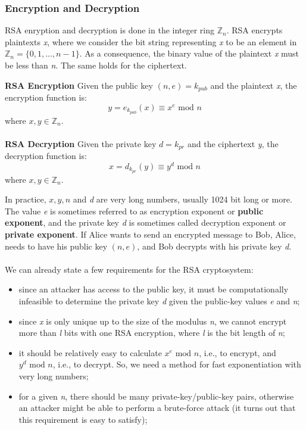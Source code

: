 \documentclass[11pt, a4paper]{article}
\newcommand{\mymod}{
    \text{ mod }
}
\begin{document}
\subsubsection{Encryption and Decryption}
RSA enryption and decryption is done in the integer ring $\mathbb{Z}_n$. RSA encrypts plaintexts \textit{x}, where we consider the bit string representing \textit{x} to be an element in $\mathbb{Z}_n=\{0,1,...,n-1\}$. As a consequence, the binary value of the plaintext \textit{x} must be less than \textit{n}. The same holds for the ciphertext.
\begin{framed}
    \hfill\break\textbf{RSA Encryption} Given the public key $(n,e)=k_{pub}$ and the plaintext \textit{x}, the encryption function \nolinebreak is:
    $$y=e_{k_{pub}}(x)\equiv x^e\mymod n$$
    where $x,y\in\mathbb{Z}_n.$\\\\
    \textbf{RSA Decryption} Given the private key $d=k_{pr}$ and the ciphertext \textit{y}, the decryption function \nolinebreak is:
    $$x=d_{k_{pr}}(y)\equiv y^d\mymod n$$
    where $x,y\in\mathbb{Z}_n.$
\end{framed}
In practice, $x, y, n$ and \textit{d} are very long numbers, usually 1024 bit long or more. The value \textit{e} is sometimes referred to as encryption exponent or \textbf{public exponent}, and the private key \textit{d} is sometimes called decryption exponent or \textbf{private exponent}. If Alice wants to send an encrypted message to Bob, Alice, needs to have his public key $(n,e)$, and Bob decrypts with his private key \textit{d}.\\\\
We can already state a few requirements for the RSA cryptosystem:
\begin{itemize}
    \item since an attacker has access to the public key, it must be computationally infeasible to determine the private key \textit{d} given the public-key values \textit{e} and \textit{n};
    \item since \textit{x} is only unique up to the size of the modulus \textit{n}, we cannot encrypt more than \textit{l} bits with one RSA encryption, where \textit{l} is the bit length of \textit{n};
    \item it should be relatively easy to calculate $x^e\mymod n$, i.e., to encrypt, and $y^d\mymod n$, i.e., to decrypt. So, we need a method for fast exponentiation with very long numbers;
    \item for a given \textit{n}, there should be many private-key/public-key pairs, otherwise an attacker might be able to perform a brute-force attack (it turns out that this requirement is easy to satisfy);
\end{itemize}
\end{document}
